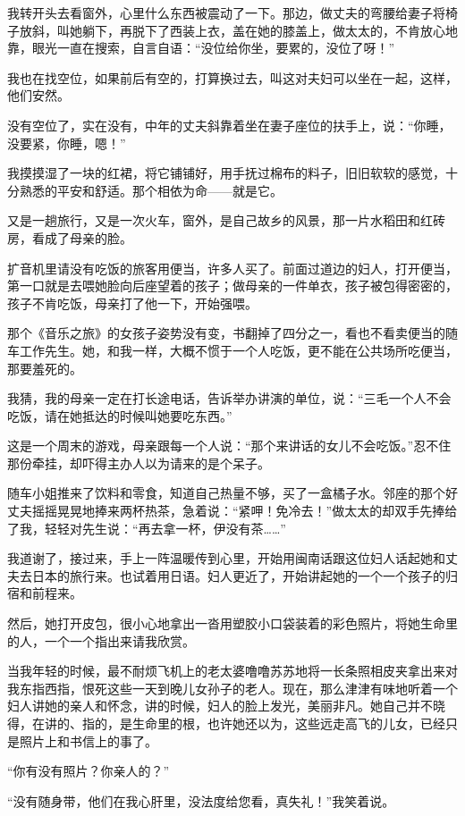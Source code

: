 \par 我转开头去看窗外，心里什么东西被震动了一下。那边，做丈夫的弯腰给妻子将椅子放斜，叫她躺下，再脱下了西装上衣，盖在她的膝盖上，做太太的，不肯放心地靠，眼光一直在搜索，自言自语：“没位给你坐，要累的，没位了呀！”
\par 我也在找空位，如果前后有空的，打算换过去，叫这对夫妇可以坐在一起，这样，他们安然。
\par 没有空位了，实在没有，中年的丈夫斜靠着坐在妻子座位的扶手上，说：“你睡，没要紧，你睡，嗯！”
\par 我摸摸湿了一块的红裙，将它铺铺好，用手抚过棉布的料子，旧旧软软的感觉，十分熟悉的平安和舒适。那个相依为命——就是它。
\par 又是一趟旅行，又是一次火车，窗外，是自己故乡的风景，那一片水稻田和红砖房，看成了母亲的脸。
\par 扩音机里请没有吃饭的旅客用便当，许多人买了。前面过道边的妇人，打开便当，第一口就是去喂她脸向后座望着的孩子；做母亲的一件单衣，孩子被包得密密的，孩子不肯吃饭，母亲打了他一下，开始强喂。
\par 那个《音乐之旅》的女孩子姿势没有变，书翻掉了四分之一，看也不看卖便当的随车工作先生。她，和我一样，大概不惯于一个人吃饭，更不能在公共场所吃便当，那要羞死的。
\par 我猜，我的母亲一定在打长途电话，告诉举办讲演的单位，说：“三毛一个人不会吃饭，请在她抵达的时候叫她要吃东西。”
\par 这是一个周末的游戏，母亲跟每一个人说：“那个来讲话的女儿不会吃饭。”忍不住那份牵挂，却吓得主办人以为请来的是个呆子。
\par 随车小姐推来了饮料和零食，知道自己热量不够，买了一盒橘子水。邻座的那个好丈夫摇摇晃晃地捧来两杯热茶，急着说：“紧呷！免冷去！”做太太的却双手先捧给了我，轻轻对先生说：“再去拿一杯，伊没有茶……”
\par 我道谢了，接过来，手上一阵温暖传到心里，开始用闽南话跟这位妇人话起她和丈夫去日本的旅行来。也试着用日语。妇人更近了，开始讲起她的一个一个孩子的归宿和前程来。
\par 然后，她打开皮包，很小心地拿出一沓用塑胶小口袋装着的彩色照片，将她生命里的人，一个一个指出来请我欣赏。
\par 当我年轻的时候，最不耐烦飞机上的老太婆噜噜苏苏地将一长条照相皮夹拿出来对我东指西指，恨死这些一天到晚儿女孙子的老人。现在，那么津津有味地听着一个妇人讲她的亲人和怀念，讲的时候，妇人的脸上发光，美丽非凡。她自己并不晓得，在讲的、指的，是生命里的根，也许她还以为，这些远走高飞的儿女，已经只是照片上和书信上的事了。
\par “你有没有照片？你亲人的？”
\par “没有随身带，他们在我心肝里，没法度给您看，真失礼！”我笑着说。
